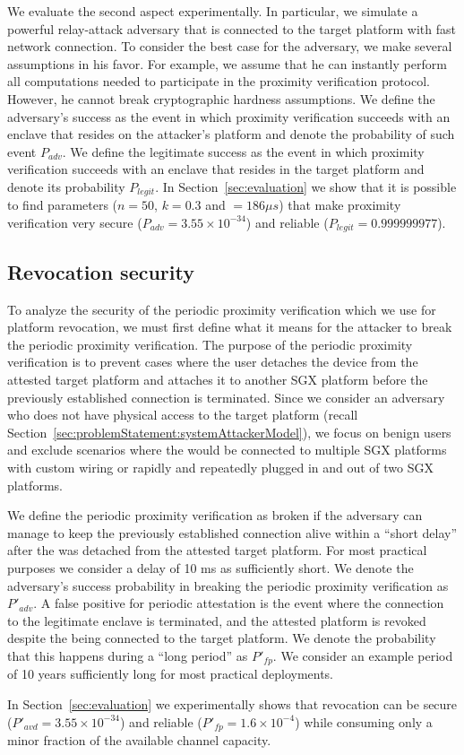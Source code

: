 We evaluate the second aspect experimentally. In particular, we simulate a powerful relay-attack adversary that is connected to the target platform with fast network connection. To consider the best case for the adversary, we make several assumptions in his favor. For example, we assume that he can instantly perform all computations needed to participate in the proximity verification protocol. However, he cannot break cryptographic hardness assumptions. We define the adversary's success as the event in which proximity verification succeeds with an enclave that resides on the attacker's platform and denote the probability of such event $P_{adv}$. We define the legitimate success as the event in which proximity verification succeeds with an enclave that resides in the target platform and denote its probability $P_{legit}$. In Section~\ref{sec:evaluation} we show that it is possible to find parameters ($n=50$, $k=0.3$ and \connect$=186 \mu s$) that make proximity verification very secure ($P_{adv}=3.55\times 10^{-34}$) and reliable ($P_{legit}=0.999999977$).




\subsection{Revocation security}
To analyze the security of the periodic proximity verification which we use for platform revocation, we must first define what it means for the attacker to break the periodic proximity verification. The purpose of the periodic proximity verification is to prevent cases where the user detaches the \device device from the attested target platform and attaches it to another SGX platform before the previously established connection is terminated. Since we consider an adversary who does not have physical access to the target platform (recall Section~\ref{sec:problemStatement:systemAttackerModel}), we focus on benign users and exclude scenarios where the \device would be connected to multiple SGX platforms with custom wiring or rapidly and repeatedly plugged in and out of two SGX platforms.



We define the periodic proximity verification as broken if the adversary can manage to keep the previously established connection alive within a ``short delay'' after the \device was detached from the attested target platform. For most practical purposes we consider a delay of 10 ms as sufficiently short. We denote the adversary's success probability in breaking the periodic proximity verification as $P'_{adv}$.
%
A false positive for periodic attestation is the event where the connection to the legitimate enclave is terminated, and the attested platform is revoked despite the \device being connected to the target platform. We denote the probability that this happens during a ``long period'' as $P'_{fp}$. We consider an example period of 10 years sufficiently long for most practical deployments.

In Section~\ref{sec:evaluation} we experimentally shows that revocation can be secure ($P'_{avd}=3.55\times10^{-34}$) and reliable
($P'_{fp}=1.6\times10^{-4}$) while consuming only a minor fraction of the available channel capacity.
